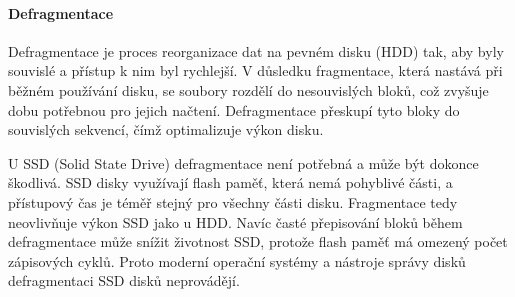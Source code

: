 \paragraph{Defragmentace}
Defragmentace je proces reorganizace dat na pevném disku (HDD) tak, aby byly souvislé a přístup k nim byl rychlejší. V důsledku fragmentace, která nastává při běžném používání disku, se soubory rozdělí do nesouvislých bloků, což zvyšuje dobu potřebnou pro jejich načtení. Defragmentace přeskupí tyto bloky do souvislých sekvencí, čímž optimalizuje výkon disku.

U SSD (Solid State Drive) defragmentace není potřebná a může být dokonce škodlivá. SSD disky využívají flash paměť, která nemá pohyblivé části, a přístupový čas je téměř stejný pro všechny části disku. Fragmentace tedy neovlivňuje výkon SSD jako u HDD. Navíc časté přepisování bloků během defragmentace může snížit životnost SSD, protože flash paměť má omezený počet zápisových cyklů. Proto moderní operační systémy a nástroje správy disků defragmentaci SSD disků neprovádějí.